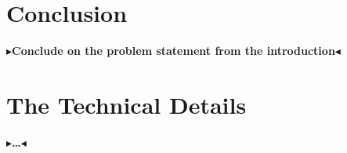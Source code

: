 \documentclass[twoside,11pt,openright]{report}
\theoremstyle{definition}
\newcommand{\todo}[1]{{\color[rgb]{.5,0,0}\textbf{$\blacktriangleright$#1$\blacktriangleleft$}}}
\begin{document}
\chapter{Conclusion}
\label{ch:conclusion}

\todo{Conclude on the problem statement from the introduction}


\cleardoublepage
{}




\cleardoublepage
\appendix
\chapter{The Technical Details}

\todo{\dots}
\end{document}
